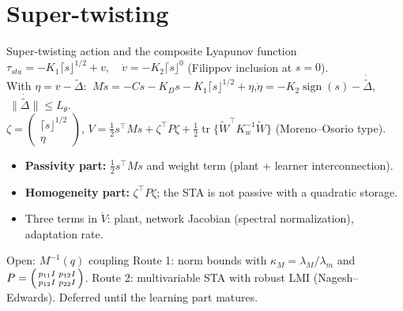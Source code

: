 \documentclass[aspectratio=169,10pt]{beamer}
\newenvironment{psmallmatrix}{\left(\begin{smallmatrix}}{\end{smallmatrix}\right)}
\newcommand{\tr}{\operatorname{tr}}
\newcommand{\sgn}{\operatorname{sign}}
\begin{document}
\section{Super-twisting}
\begin{frame}{Super-twisting action and the composite Lyapunov function}
$\tau_{sta}=-K_1\lceil s\rfloor^{1/2}+v,\quad\dot v=-K_2\lceil s\rfloor^0$ (Filippov inclusion at $s=0$).\\[1mm]
With $\eta=v-\tilde\Delta$: $\ M\dot s=-Cs-K_Ds-K_1\lceil s\rfloor^{1/2}+\eta$,\quad $\dot\eta=-K_2\sgn(s)-\dot{\tilde\Delta}$, $\ \|\dot{\tilde\Delta}\|\le L_\theta$.\\[1mm]
$\zeta=\begin{pmatrix}\lceil s\rfloor^{1/2}\\ \eta\end{pmatrix}$, \quad
$V=\tfrac12s^\top Ms+\zeta^\top P\zeta+\tfrac12\tr\{\tilde W^\top K_w^{-1}\tilde W\}$ (Moreno--Osorio type).
\begin{itemize}
\item \textbf{Passivity part:} $\tfrac12s^\top Ms$ and weight term (plant + learner interconnection).
\item \textbf{Homogeneity part:} $\zeta^\top P\zeta$; the STA is not passive with a quadratic storage.
\item Three terms in $\dot V$: plant, network Jacobian (spectral normalization), adaptation rate.
\end{itemize}
\begin{alertblock}{Open: $M^{-1}(q)$ coupling}
Route 1: norm bounds with $\kappa_M=\lambda_M/\lambda_m$ and $P=\begin{psmallmatrix}p_{11}I&p_{12}I\\p_{12}I&p_{22}I\end{psmallmatrix}$. Route 2: multivariable STA with robust LMI (Nagesh--Edwards). Deferred until the learning part matures.
\end{alertblock}
\end{frame}

\end{document}
